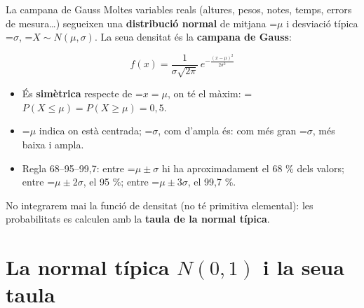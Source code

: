 \documentclass[11pt,a4paper]{article}
\newcommand{\fmm}[1]{\setbox0=\hbox{$#1$}\ifdim\wd0>\linewidth\[#1\]\else\mbox{\box0}\fi}
\begin{document}
  

  
\begin{fmdef}{La campana de Gauss}
Moltes variables reals (altures, pesos, notes, temps, errors de mesura\dots{}) segueixen una \textbf{distribució normal} de mitjana \fmm{\mu} i desviació típica \fmm{\sigma}, \fmm{X\sim N(\mu,\sigma)}. La seua densitat és la \textbf{campana de Gauss}:

      
\[f(x)=\frac{1}{\sigma\sqrt{2\pi}}\,e^{-\frac{(x-\mu)^2}{2\sigma^2}}\]

      
\begin{itemize}
\item És \textbf{simètrica} respecte de \fmm{x=\mu}, on té el màxim: \fmm{P(X\leq\mu)=P(X\geq\mu)=0{,}5}.
\item \fmm{\mu} indica on està centrada; \fmm{\sigma}, com d'ampla és: com més gran \fmm{\sigma}, més baixa i ampla.
\item Regla 68--95--99,7: entre \fmm{\mu\pm\sigma} hi ha aproximadament el 68 \% dels valors; entre \fmm{\mu\pm2\sigma}, el 95 \%; entre \fmm{\mu\pm3\sigma}, el 99,7 \%.
\end{itemize}

      
\begin{fmnote}No integrarem mai la funció de densitat (no té primitiva elemental): les probabilitats es calculen amb la \textbf{taula de la normal típica}.\end{fmnote}
\end{fmdef}

\section{La normal típica $N(0,1)$ i la seua taula}\hypertarget{sec6}{}

  
\end{document}
